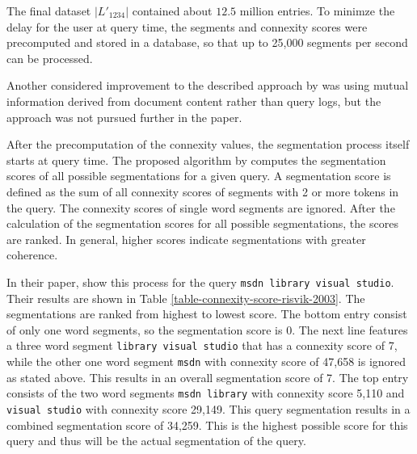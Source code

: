 The final dataset $|L'_{1234}|$ contained about $12.5$ million entries. 
To minimze the delay for the user at query time, the segments and connexity scores were precomputed and stored in a database, so that up to 25,000 segments per second can be processed.

Another considered improvement to the described approach by \citeauthor{Risvik:2003} was using mutual information derived from document content rather than query logs, but the approach was not pursued further in the paper.

After the precomputation of the connexity values, the segmentation process itself starts at query time. The proposed algorithm by \citeauthor{Risvik:2003} computes the segmentation scores of all possible segmentations for a given query.
A segmentation score is defined as the sum of all connexity scores of segments with 2 or more tokens in the query. The connexity scores of single word segments are ignored. After the calculation of the segmentation scores for all possible segmentations, the scores are ranked. In general, higher scores indicate segmentations with greater coherence. 

In their paper, \citeauthor{Risvik:2003} show this process for the query \texttt{msdn library visual studio}. Their results are shown in Table \ref{table-connexity-score-risvik-2003}.
The segmentations are ranked from highest to lowest score. The bottom entry consist of only one word segments, so the segmentation score is 0. The next line features a three word segment \texttt{library visual studio} that has a connexity score of 7, while the other one word segment \texttt{msdn} with connexity score of 47,658 is ignored as stated above. This results in an overall segmentation score of 7.
The top entry consists of the two word segments \texttt{msdn library} with connexity score 5,110 and \texttt{visual studio} with connexity score 29,149. This query segmentation results in a combined segmentation score of 34,259. This is the highest possible score for this query and thus will be the actual segmentation of the query.



